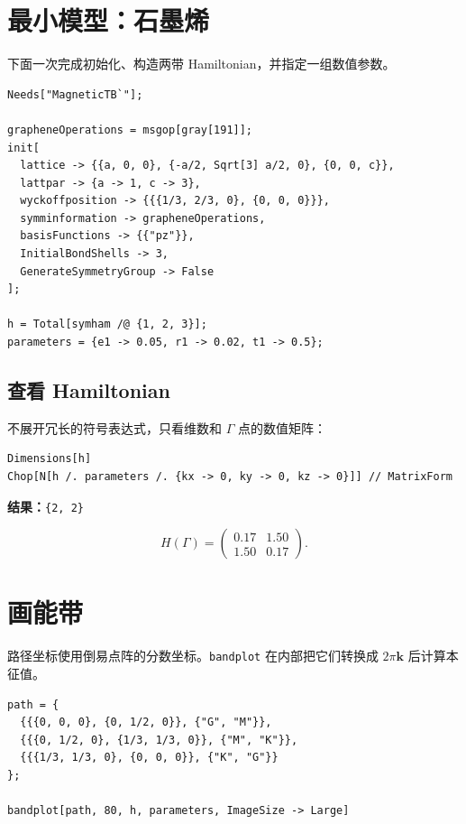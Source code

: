 \documentclass[UTF8,fontset=mac,11pt]{ctexart}
\newcommand{\result}[1]{%
  \par\smallskip
  {\color{gray}\textbf{结果：}}\texttt{#1}
  \par\smallskip
}
\begin{document}
\newpage

\section{最小模型：石墨烯}

下面一次完成初始化、构造两带 Hamiltonian，并指定一组数值参数。

\begin{lstlisting}
Needs["MagneticTB`"];

grapheneOperations = msgop[gray[191]];
init[
  lattice -> {{a, 0, 0}, {-a/2, Sqrt[3] a/2, 0}, {0, 0, c}},
  lattpar -> {a -> 1, c -> 3},
  wyckoffposition -> {{{1/3, 2/3, 0}, {0, 0, 0}}},
  symminformation -> grapheneOperations,
  basisFunctions -> {{"pz"}},
  InitialBondShells -> 3,
  GenerateSymmetryGroup -> False
];

h = Total[symham /@ {1, 2, 3}];
parameters = {e1 -> 0.05, r1 -> 0.02, t1 -> 0.5};
\end{lstlisting}

\subsection{查看 Hamiltonian}

不展开冗长的符号表达式，只看维数和 $\Gamma$ 点的数值矩阵：

\begin{lstlisting}
Dimensions[h]
Chop[N[h /. parameters /. {kx -> 0, ky -> 0, kz -> 0}]] // MatrixForm
\end{lstlisting}

\result{\{2, 2\}}

\[
H(\Gamma)=
\begin{pmatrix}
0.17 & 1.50\\
1.50 & 0.17
\end{pmatrix}.
\]

\newpage

\section{画能带}

路径坐标使用倒易点阵的分数坐标。\texttt{bandplot} 在内部把它们转换成
$2\pi\mathbf{k}$ 后计算本征值。

\begin{lstlisting}
path = {
  {{{0, 0, 0}, {0, 1/2, 0}}, {"G", "M"}},
  {{{0, 1/2, 0}, {1/3, 1/3, 0}}, {"M", "K"}},
  {{{1/3, 1/3, 0}, {0, 0, 0}}, {"K", "G"}}
};

bandplot[path, 80, h, parameters, ImageSize -> Large]
\end{lstlisting}
\end{document}
